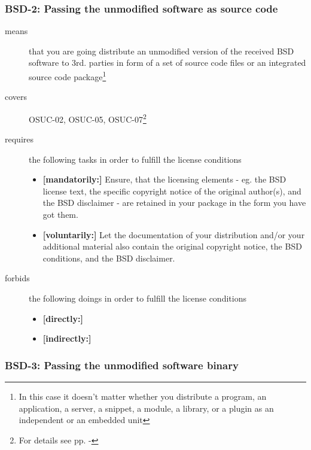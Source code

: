 \subsubsection{BSD-2: Passing the unmodified software as source code}
\label{OSUC-02-BSD} \label{OSUC-05-BSD} \label{OSUC-07-BSD} 

\begin{description}
\item[means] that you are going distribute an unmodified version of the received
BSD software to 3rd. parties in form of a set of source code files or an
integrated source code package\footnote{In this case it doesn't matter whether
you  distribute a program, an application, a server, a snippet, a module, a
library, or a plugin as an independent or an embedded unit} 

\item[covers] OSUC-02, OSUC-05, OSUC-07\footnote{For details see pp.
\pageref{OSUC-02-DEF} - \pageref{OSUC-07-DEF}}

\item[requires] the following tasks in order to fulfill the license conditions
\begin{itemize}
  \item \textbf{[mandatorily:]} Ensure, that the licensing elements - eg.
  the BSD license text, the specific copyright notice of the original author(s),
  and the BSD disclaimer - are retained in your package in the form you have got
  them.
  \item \textbf{[voluntarily:]} Let the documentation of your distribution
  and/or your additional material also contain the original copyright notice, the
  BSD conditions, and the BSD disclaimer.
\end{itemize}

\item[forbids] the following doings in order to fulfill the license conditions
\begin{itemize}
  \item \textbf{[directly:]} 
  \item \textbf{[indirectly:]}

\end{itemize}
\end{description}

\subsubsection{BSD-3: Passing the unmodified software binary}

